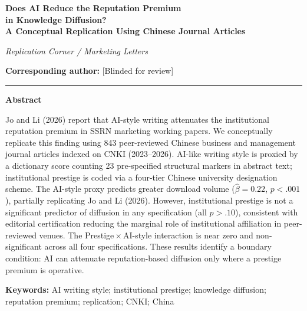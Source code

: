 \documentclass[12pt,a4paper]{article}
\begin{document}
\begin{center}
{\large\textbf{Does AI Reduce the Reputation Premium\\[0.3em]
in Knowledge Diffusion?\\[0.3em]
A Conceptual Replication Using Chinese Journal Articles}}

\medskip
{\normalsize\textit{Replication Corner / Marketing Letters}}
\end{center}

\bigskip


\bigskip

\noindent
\textbf{Corresponding author:} [Blinded for review]

\bigskip\hrule\bigskip

\noindent\textbf{Abstract}

\medskip\noindent
Jo and Li (2026) report that AI-style writing attenuates the
institutional reputation premium in SSRN marketing working papers.
We conceptually replicate this finding using 843 peer-reviewed Chinese
business and management journal articles indexed on CNKI (2023--2026).
AI-like writing style is proxied by a dictionary score counting 23
pre-specified structural markers in abstract text; institutional prestige
is coded via a four-tier Chinese university designation scheme.
The AI-style proxy predicts greater download volume
($\hat\beta = 0.22$, $p < .001$), partially replicating Jo and Li (2026).
However, institutional prestige is not a significant predictor of
diffusion in any specification (all $p > .10$), consistent with
editorial certification reducing the marginal role of institutional
affiliation in peer-reviewed venues.
The Prestige\,$\times$\,AI-style interaction is near zero and
non-significant across all four specifications.
These results identify a boundary condition: AI can attenuate
reputation-based diffusion only where a prestige premium is operative.

\bigskip

\noindent\textbf{Keywords:} AI writing style; institutional prestige;
knowledge diffusion; reputation premium; replication; CNKI; China
\end{document}
